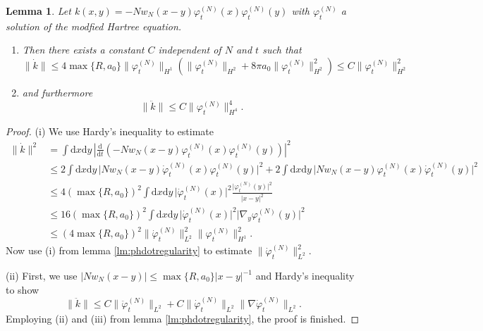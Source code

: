 \documentclass[11pt,a4paper]{scrartcl}
\newtheorem{lem}[thm]{Lemma}
\newcommand{\di}{\textrm{d}}		%
\newcommand{\norm}[1]{\lVert#1\rVert}	%
\newcommand{\ph}{\varphi_t^{(N)}}	%
\newcommand{\phdot}{\dot{\varphi}_t^{(N)}}	%
\newcommand{\phddot}{\ddot{\varphi}_t^{(N)}}	%
\newcommand{\bd}{\begin{displaymath}}			%
\newcommand{\ed}{\end{displaymath}}
\begin{document}
\begin{lem} \label{lm:kbounds} Let $k(x,y) = -N w_N(x-y) \ph(x) \ph(y)$ with $\ph$ a solution of the modfied Hartree equation.
\begin{enumerate}
\item Then there exists a constant $C$ independent of $N$ and $t$ such that
\bd
\norm{\dot k} \leq 4 \max\{R,a_0\} \norm{\ph}_{H^1} \left( \norm{\ph}_{H^2} + 8\pi a_0 \norm{\ph}_{H^2}^2\right) \leq C \norm{\ph}_{H^2}^2
\ed
\item and furthermore
\bd
\norm{\ddot k} \leq C \norm{\ph}_{H^4}^4.
\ed
\end{enumerate}
\end{lem}
\begin{proof} (i) We use Hardy's inequality to estimate
\begin{align*}
\norm{\dot k}^2 & = \int \di x\di y\, \left\lvert \frac{\di}{\di t} \left( -N w_N(x-y) \ph(x)\ph(y) \right) \right\rvert^2 \\
& \leq 2 \int \di x\di y\, \lvert N w_N(x-y) \phdot(x) \ph(y) \rvert^2 + 2 \int \di x \di y\, \lvert N w_N(x-y) \ph(x) \phdot(y) \rvert^2 \\
& \leq 4 \left( \max\{R,a_0\} \right)^2 \int \di x\di y\, \lvert \phdot(x)\rvert^2 \frac{\lvert\ph(y)\rvert^2}{\lvert x-y\rvert^2} \\
& \leq 16 \left( \max\{R,a_0\} \right)^2 \int \di x\di y\, \lvert \phdot(x)\rvert^2 \lvert \nabla_y \ph(y)\rvert^2 \\
& \leq \left( 4 \max\{R,a_0\} \right)^2 \norm{\phdot}_{L^2}^2 \norm{\ph}_{H^1}^2.
\end{align*}
Now use (i) from lemma \ref{lm:phdotregularity} to estimate $\norm{\phdot}_{L^2}^2$.

(ii) First, we use $\lvert N w_N(x-y) \rvert \leq \max \{R,a_0\} \lvert x-y\rvert^{-1}$ and Hardy's inequality to show
\bd
\norm{\ddot k} \leq C \norm{\phddot}_{L^2} + C \norm{\phdot}_{L^2} \norm{\nabla \phdot}_{L^2}.
\ed
Employing (ii) and (iii) from lemma \ref{lm:phdotregularity}, the proof is finished.
\end{proof}




\end{document}

